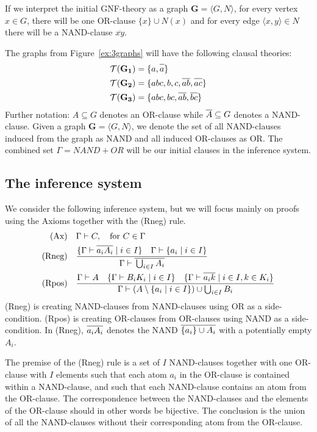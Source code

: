 If we interpret the initial GNF-theory as a graph $\mathbf{G}=\langle G,N\rangle$, for every vertex $x \in G$, there will be one OR-clause $\{ x \} \cup N(x)$ and for every edge $\langle x,y \rangle \in N$ there will be a NAND-clause $\overline{xy}$.

The graphs from Figure~\ref{ex:3graphs} will have the following clausal theories:
\begin{align}
  \mathcal{T}(\mathbf{G_1}) &= \{ a, \ol{a} \}\\
  \mathcal{T}(\mathbf{G_2}) &= \{ abc, b, c, \ol{ab}, \ol{ac} \}\\
  \mathcal{T}(\mathbf{G_3}) &= \{ abc, bc, \ol{ab}, \ol{bc} \}
\end{align}
Further notation: $A\subseteq G$ denotes an OR-clause while $\ol{A} \subseteq G$ denotes a NAND-clause.
Given a graph $\mathbf{G}=\langle G,N\rangle$, we denote the set of all NAND-clauses induced from the graph as NAND and all induced OR-clauses as OR.
The combined set $\Gamma = NAND + OR$ will be our initial clauses in the inference system.
\subsection{The inference system}
\label{sub:The inference system}
We consider the following inference system, but we will focus mainly on proofs using the Axioms together with the (Rneg) rule.
\begin{align}
  \text{(Ax)} &\quad \Gamma \vdash C, \quad \text{for } C \in \Gamma\\
  \text{(Rneg)} &\quad \frac{ \{ \Gamma \vdash \ol{a_iA_i} \; |\; i \in I \} \quad \Gamma \vdash \{ a_i \; |\; i \in I \} }{ \Gamma \vdash \ol{\bigcup_{i \in I} A_i} }\\
  \text{(Rpos)} &\quad \frac{ \Gamma \vdash A \quad \{\Gamma \vdash B_iK_i \; |\; i \in I \} \quad \{ \Gamma \vdash \ol{a_ik} \; |\; i \in I, k \in K_i \} }{ \Gamma \vdash (A \setminus \{ a_i \; |\; i \in I \} ) \cup \bigcup_{i \in I} B_i }
\end{align}
(Rneg) is creating NAND-clauses from NAND-clauses using OR as a side-condition.
(Rpos) is creating OR-clauses from OR-clauses using NAND as a side-condition.
In (Rneg), $\ol{a_iA_i}$ denotes the NAND $\ol{\{ a_i \} \cup A_i}$ with a potentially empty $A_i$.

The premise of the (Rneg) rule is a set of $I$ NAND-clauses together with one OR-clause with $I$ elements such that each atom $a_i$ in the OR-clause is contained within a NAND-clause, and such that each NAND-clause contains an atom from the OR-clause.
The correspondence between the NAND-clauses and the elements of the OR-clause should in other words be bijective.
The conclusion is the union of all the NAND-clauses without their corresponding atom from the OR-clause.

